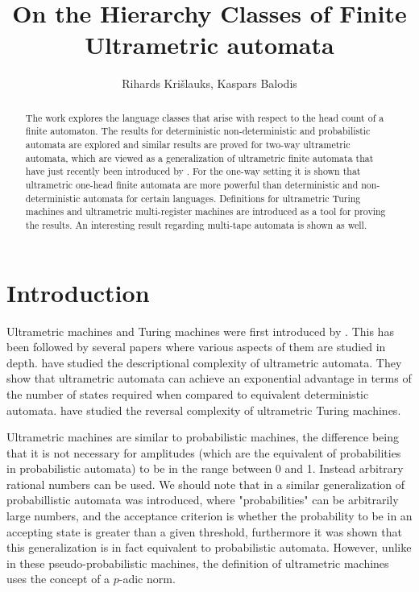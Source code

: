 \documentclass{llncs}
\begin{document}
\title{On the Hierarchy Classes of Finite Ultrametric automata}


\author{
Rihards Kri\v slauks, Kaspars Balodis}

\maketitle

\begin{abstract}
The work explores the language classes that arise with respect to the head count of a finite automaton. The results for deterministic non-deterministic and probabilistic automata are explored and similar results are proved for two-way ultrametric automata, which are viewed as a generalization of ultrametric finite automata that have just recently been introduced by \citet{Freivalds2012}. For the one-way setting it is shown that ultrametric one-head finite automata are more powerful than deterministic and non-deterministic automata for certain languages. Definitions for ultrametric Turing machines and ultrametric multi-register machines are introduced as a tool for proving the results. An interesting result regarding multi-tape automata is shown as well.
\end{abstract}



\section{Introduction} 
Ultrametric machines and Turing machines were first introduced by \citet{Freivalds2012}. This has been followed by several papers where various aspects of them are studied in depth. \citet{ KasparsBalodis2013} have studied the descriptional complexity of ultrametric automata. They show that ultrametric automata can achieve an exponential advantage in terms of the number of states required when compared to equivalent deterministic automata. \citet{Krislauks2013} have studied the reversal complexity of ultrametric Turing machines.

Ultrametric machines are similar to probabilistic machines, the difference being that it is not necessary for amplitudes (which are the equivalent of probabilities in probabilistic automata) to be in the range between 0 and 1. Instead arbitrary rational numbers can be used. We should note that in \citep{Turakainen1969} a similar generalization of probabillistic automata was introduced, where "probabilities" can be arbitrarily large numbers, and the acceptance criterion is whether the probability to be in an accepting state is greater than a given threshold, furthermore it was shown that this generalization is in fact equivalent to probabilistic automata. However, unlike in these pseudo-probabilistic machines, the definition of ultrametric machines uses the concept of a $p$-adic norm.
\end{document}
